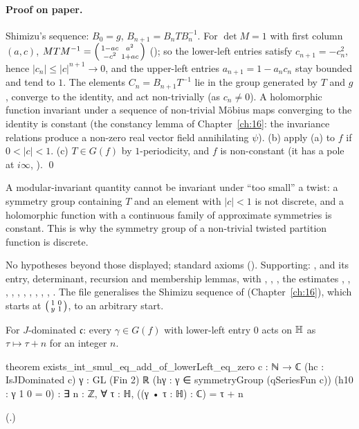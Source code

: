 \paragraph{Proof on paper.}  Shimizu's sequence: $B_0=g$, $B_{n+1}=B_nTB_n^{-1}$.  For $\det M=1$ with first column $(a,c)$,
$MTM^{-1}=\left(\begin{smallmatrix}1-ac&a^2\\-c^2&1+ac\end{smallmatrix}\right)$ (); so the lower-left entries satisfy $c_{n+1}=-c_n^2$, hence
$|c_n|\le|c|^{n+1}\to0$, and the upper-left entries $a_{n+1}=1-a_nc_n$ stay bounded and tend to $1$.  The elements $C_n=B_{n+1}T^{-1}$
lie in the group generated by $T$ and $g$, converge to the identity, and act non-trivially (as $c_n\ne0$).  A holomorphic function
invariant under a sequence of non-trivial M\"obius maps converging to the identity is constant (the constancy lemma
 of Chapter~\ref{ch:16}: the invariance relations produce a non-zero real vector field
annihilating $\psi$).  (b) apply (a) to $f$ if $0<|c|<1$.  (c) $T\in G(f)$ by $1$-periodicity, and $f$ is non-constant (it has a pole at
$i\infty$, ). \qed
\begin{physics}A modular-invariant quantity cannot be invariant under ``too small'' a twist: a symmetry group containing $T$ and an
element with $|c|<1$ is not discrete, and a holomorphic function with a continuous family of approximate symmetries is constant.
This is why the symmetry group of a non-trivial twisted partition function is discrete.\end{physics}
\begin{status}No hypotheses beyond those displayed; standard axioms ().  Supporting:
,  and its entry, determinant, recursion and membership lemmas,
 with , , , the estimates ,
, , , , ,
, , ,
, .  The file generalises the Shimizu sequence
of  (Chapter~\ref{ch:16}), which starts at $\left(\begin{smallmatrix}1&0\\y&1\end{smallmatrix}\right)$, to an arbitrary start.\end{status}

\begin{theorem}\label{ch19:thm:stab}
For $J$-dominated $\mathfrak c$: every $\gamma\in G(f)$ with lower-left entry $0$ acts on $\mathbb{H}$ as $\tau\mapsto\tau+n$ for an integer $n$.
\end{theorem}
\begin{leancode}
theorem exists_int_smul_eq_add_of_lowerLeft_eq_zero {c : ℕ → ℂ} (hc : IsJDominated c)
    {γ : GL (Fin 2) ℝ} (hγ : γ ∈ symmetryGroup (qSeriesFun c)) (h10 : γ 1 0 = 0) :
    ∃ n : ℤ, ∀ τ : ℍ, ((γ • τ : ℍ) : ℂ) = τ + n
\end{leancode}
(.)
